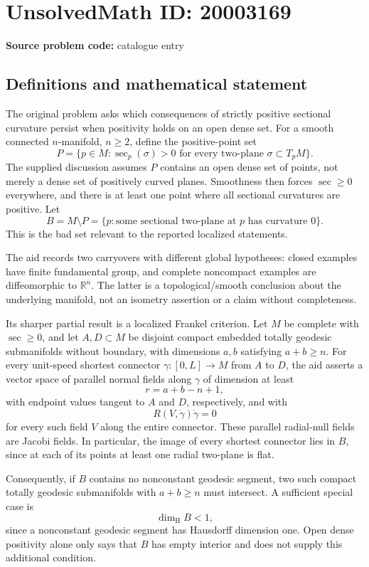 \documentclass[11pt]{article}
\newcommand{\R}{\mathbb{R}}
\begin{document}
\section*{UnsolvedMath ID: 20003169}
\textbf{Source problem code:} catalogue entry
\subsection{Definitions and mathematical statement}
The original problem asks which consequences of strictly positive sectional curvature persist when positivity holds on an open dense set. For a smooth connected \(n\)-manifold, \(n\geq2\), define the positive-point set
\[
 P=\{p\in M:\sec_p(\sigma)>0\text{ for every two-plane }\sigma\subset T_pM\}.
\]
The supplied discussion assumes \(P\) contains an open dense set of points, not merely a dense set of positively curved planes. Smoothness then forces \(\sec\geq0\) everywhere, and there is at least one point where all sectional curvatures are positive. Let
\[
 B=M\setminus P=\{p:\text{some sectional two-plane at }p\text{ has curvature }0\}.
\]
This is the bad set relevant to the reported localized statements.

The aid records two carryovers with different global hypotheses: closed examples have finite fundamental group, and complete noncompact examples are diffeomorphic to \(\R^n\). The latter is a topological/smooth conclusion about the underlying manifold, not an isometry assertion or a claim without completeness.

Its sharper partial result is a localized Frankel criterion. Let \(M\) be complete with \(\sec\geq0\), and let \(A,D\subset M\) be disjoint compact embedded totally geodesic submanifolds without boundary, with dimensions \(a,b\) satisfying \(a+b\geq n\). For every unit-speed shortest connector \(\gamma:[0,L]\to M\) from \(A\) to \(D\), the aid asserts a vector space of parallel normal fields along \(\gamma\) of dimension at least
\[
 r=a+b-n+1,
\]
with endpoint values tangent to \(A\) and \(D\), respectively, and with
\[
 R(V,\dot\gamma)\dot\gamma=0
\]
for every such field \(V\) along the entire connector. These parallel radial-null fields are Jacobi fields. In particular, the image of every shortest connector lies in \(B\), since at each of its points at least one radial two-plane is flat.

Consequently, if \(B\) contains no nonconstant geodesic segment, two such compact totally geodesic submanifolds with \(a+b\geq n\) must intersect. A sufficient special case is
\[
 \dim_{\mathrm H}B<1,
\]
since a nonconstant geodesic segment has Hausdorff dimension one. Open dense positivity alone only says that \(B\) has empty interior and does not supply this additional condition.
\end{document}
